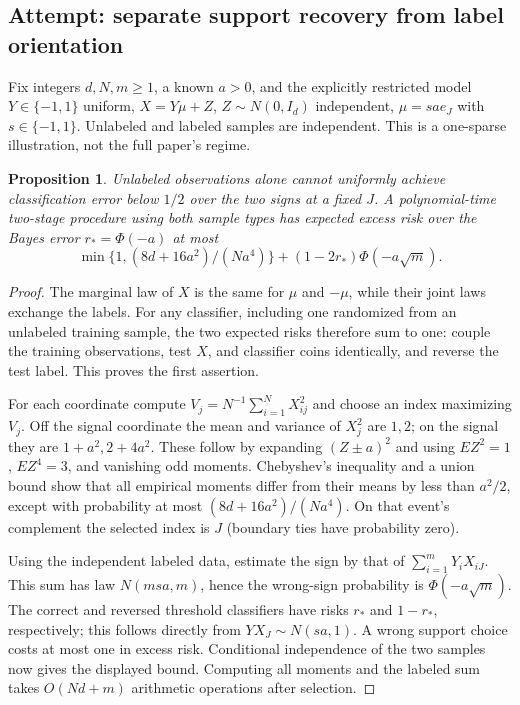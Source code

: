 \documentclass[11pt]{article}
\newtheorem{proposition}{Proposition}
\begin{document}
\subsection{Attempt: separate support recovery from label orientation}
Fix integers $d,N,m\ge1$, a known $a>0$, and the explicitly restricted model $Y\in\{-1,1\}$ uniform, $X=Y\mu+Z$, $Z\sim N(0,I_d)$ independent, $\mu=sa e_J$ with $s\in\{-1,1\}$. Unlabeled and labeled samples are independent. This is a one-sparse illustration, not the full paper's regime.
\begin{proposition}
Unlabeled observations alone cannot uniformly achieve classification error below $1/2$ over the two signs at a fixed $J$. A polynomial-time two-stage procedure using both sample types has expected excess risk over the Bayes error $r_*=\Phi(-a)$ at most
\[
 \min\{1,(8d+16a^2)/(Na^4)\}+(1-2r_*)\Phi(-a\sqrt m).
\]
\end{proposition}
\begin{proof}
The marginal law of $X$ is the same for $\mu$ and $-\mu$, while their joint laws exchange the labels. For any classifier, including one randomized from an unlabeled training sample, the two expected risks therefore sum to one: couple the training observations, test $X$, and classifier coins identically, and reverse the test label. This proves the first assertion.

For each coordinate compute $V_j=N^{-1}\sum_{i=1}^N X_{ij}^2$ and choose an index maximizing $V_j$. Off the signal coordinate the mean and variance of $X_j^2$ are $1,2$; on the signal they are $1+a^2,2+4a^2$. These follow by expanding $(Z\pm a)^2$ and using $E Z^2=1$, $E Z^4=3$, and vanishing odd moments. Chebyshev's inequality and a union bound show that all empirical moments differ from their means by less than $a^2/2$, except with probability at most $(8d+16a^2)/(Na^4)$. On that event's complement the selected index is $J$ (boundary ties have probability zero).

Using the independent labeled data, estimate the sign by that of $\sum_{i=1}^mY_iX_{iJ}$. This sum has law $N(msa,m)$, hence the wrong-sign probability is $\Phi(-a\sqrt m)$. The correct and reversed threshold classifiers have risks $r_*$ and $1-r_*$, respectively; this follows directly from $YX_J\sim N(sa,1)$. A wrong support choice costs at most one in excess risk. Conditional independence of the two samples now gives the displayed bound. Computing all moments and the labeled sum takes $O(Nd+m)$ arithmetic operations after selection.
\end{proof}
\end{document}
